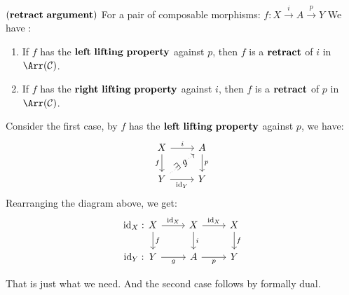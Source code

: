         \begin{lem}
            $\mathbf{(retract\ argument)}$ For a pair of composable morphisms:
            $f : X \overset{i}{\longrightarrow} A \overset{p}{\longrightarrow}  Y$
            We have :
            \begin{enumerate}
                \item If $f$ has the $\mathbf{left\ lifting\ property}$ against $p$, then $f$ is a $\mathbf{retract}$ of $i$ in $\Arr(\mcC)$.
                \item If $f$ has the $\mbf{right\ lifting\ property}$ against $i$, then $f$ is a $\mathbf{retract}$ of $p$ in $\Arr(\mcC)$.
            \end{enumerate}
        \end{lem}

        \begin{prf}
            Consider the first case, by $f$ has the $\mathbf{left\ lifting\ property}$ against $p$, we have:
            \[\begin{tikzcd}
                X & A \\
                Y & Y
                \arrow["f"', from=1-1, to=2-1]
                \arrow["i", from=1-1, to=1-2]
                \arrow["p", from=1-2, to=2-2]
                \arrow["{\id_Y}"', from=2-1, to=2-2]
                \arrow["{\E\ g}"{marking, pos=0.45}, dotted, from=2-1, to=1-2]
            \end{tikzcd}\]
            Rearranging the diagram above, we get:
            \[\begin{tikzcd}
                X & X & X \\
                Y & A & Y
                \arrow["f", from=1-1, to=2-1]
                \arrow["\id_Y : \hspace*{2.85cm}"{marking}, "g"', from=2-1, to=2-2]
                \arrow["p"', from=2-2, to=2-3]
                \arrow["\id_X : \hspace*{2.85cm}"{marking}, "{\id_X}", from=1-1, to=1-2]
                \arrow["i", from=1-2, to=2-2]
                \arrow["{\id_X}", from=1-2, to=1-3]
                \arrow["f", from=1-3, to=2-3]
            \end{tikzcd}\]
            \par That is just what we need.
            And the second case follows by formally dual.
        \end{prf}

